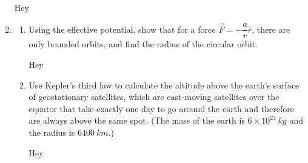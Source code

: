 \documentclass[fleqn]{article}
\begin{document}
\begin{enumerate}
    \textcolor{hwColor}{
      Hey
    }


    \item \begin{enumerate}
      \item Using the effective potential, show that for a force $\overrightarrow{F}=-\dfrac{a}{r} \hat{r}$,
      there are only bounded orbits, and find the radius of the circular orbit.

        \textcolor{hwColor}{
          Hey
        }

      \item Use Kepler’s third law to calculate the altitude above the earth’s
      surface of geostationary satellites, which are east-moving satellites
      over the equator that take exactly one day to go around the earth
      and therefore are always above the same spot. (The mass of the
      earth is $6 \times 10^{24} ~ kg$ and the radius is $6400 ~ km$.)

        \textcolor{hwColor}{
          Hey
        }


    \end{enumerate}

  \end{enumerate}
\end{document}
